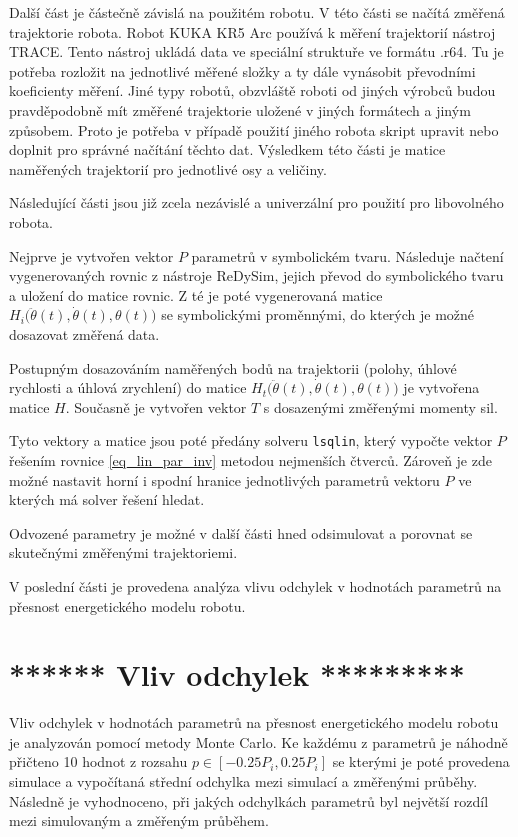 Další část je částečně závislá na použitém robotu. V této části se načítá změřená trajektorie robota. Robot KUKA KR5 Arc používá k měření trajektorií nástroj TRACE. Tento nástroj ukládá data ve speciální struktuře ve formátu .r64. Tu je potřeba rozložit na jednotlivé měřené složky a ty dále vynásobit převodními koeficienty měření. Jiné typy robotů, obzvláště roboti od jiných výrobců budou pravděpodobně mít změřené trajektorie uložené v jiných formátech a jiným způsobem. Proto je potřeba v případě použití jiného robota skript upravit nebo doplnit pro správné načítání těchto dat. Výsledkem této části je matice naměřených trajektorií pro jednotlivé osy a veličiny. 

Následující části jsou již zcela nezávislé a univerzální pro použití pro libovolného robota.  

Nejprve je vytvořen vektor $P$ parametrů v symbolickém tvaru. Následuje načtení vygenerovaných rovnic z nástroje ReDySim, jejich převod do symbolického tvaru a uložení do matice rovnic. Z té je poté vygenerovaná matice $H_i\big(\ddot{\theta}(t),\dot{\theta}(t),\theta(t)\big)$ se symbolickými proměnnými, do kterých je možné dosazovat změřená data.

Postupným dosazováním naměřených bodů na trajektorii (polohy, úhlové rychlosti a úhlová zrychlení) do matice $H_t\big(\ddot{\theta}(t),\dot{\theta}(t),\theta(t)\big)$ je vytvořena matice $H$. Současně je vytvořen vektor $T$ s dosazenými změřenými momenty sil.

Tyto vektory a matice jsou poté předány solveru \texttt{lsqlin}, který vypočte vektor $P$ řešením rovnice \ref{eq_lin_par_inv} metodou nejmenších čtverců. Zároveň je zde možné nastavit horní i spodní hranice jednotlivých parametrů vektoru $P$ ve kterých má solver řešení hledat.

Odvozené parametry je možné v další části hned odsimulovat a porovnat se skutečnými změřenými trajektoriemi.

V poslední části je provedena analýza vlivu odchylek v hodnotách parametrů na přesnost energetického modelu robotu.

\section{****** Vliv odchylek *********}

Vliv odchylek v hodnotách parametrů na přesnost energetického modelu robotu je analyzován pomocí metody Monte Carlo. Ke každému z parametrů je náhodně přičteno 10 hodnot z rozsahu $p \in [-0.25P_i,0.25P_i]$ se kterými je poté provedena simulace a vypočítaná střední odchylka mezi simulací a změřenými průběhy. Následně je vyhodnoceno, při jakých odchylkách parametrů byl největší rozdíl mezi simulovaným a změřeným průběhem.